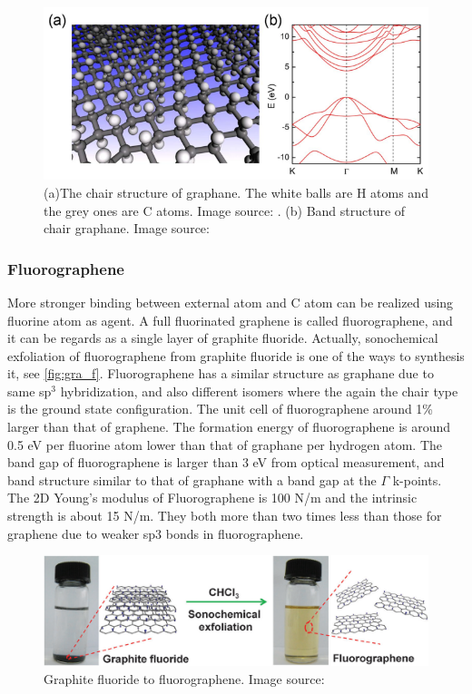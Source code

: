 \begin{figure}[htbp!] 
\centering  
\includegraphics[width=1\textwidth]{graphane.eps}
\caption[Atomic and electronic structure of graphane]{(a)The chair structure of graphane. The white balls are H atoms and the grey ones are C atoms. Image source: \cite{Sofo2007}. (b) Band structure of chair graphane. Image source: \cite{leenaerts2010}}  
\label{fig:gra_h}
\end{figure} 

\subsubsection{Fluorographene}

More stronger binding between external atom and C atom can be realized using fluorine atom as agent. A full fluorinated graphene is called fluorographene, and it can be regards as a single layer of graphite fluoride. Actually, sonochemical exfoliation of fluorographene from graphite fluoride is one of the ways to synthesis it, see \autoref{fig:gra_f}\cite{Zhu2013}. Fluorographene has a similar structure as graphane due to same sp$^3$ hybridization, and also different isomers where the again the chair type is the ground state configuration\cite{samarakoon2011}. The unit cell of fluorographene around 1\% larger than that of graphene\cite{nair2010}. The formation energy of fluorographene is around 0.5 eV per fluorine atom lower than that of graphane per hydrogen atom\cite{Jeon2011}. The band gap of fluorographene is larger than 3 eV from optical measurement\cite{nair2010,Jeon2011}, and band structure similar to that of graphane with a band gap at the $\Gamma$ k-points. The 2D Young's modulus of Fluorographene is 100 \si{N/m} and the intrinsic strength is about 15 \si{N/m}. They both more than two times less than those for graphene due to weaker sp$3$ bonds in fluorographene\cite{nair2010}.

\begin{figure}[htbp!] 
\centering  
\includegraphics[width=1\textwidth]{fluorographene.png}
\caption{Graphite fluoride to fluorographene. Image source:\cite{Zhu2013}}  
\label{fig:gra_f}
\end{figure} 

